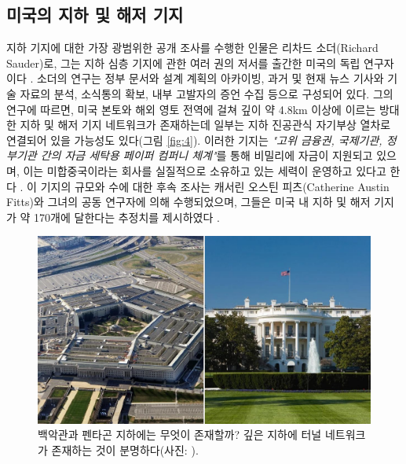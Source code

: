 \documentclass[10pt,twocolumn,letterpaper]{article}
\begin{document}
\subsection{미국의 지하 및 해저 기지}

지하 기지에 대한 가장 광범위한 공개 조사를 수행한 인물은 리차드 소더(Richard Sauder)로, 그는 지하 심층 기지에 관한 여러 권의 저서를 출간한 미국의 독립 연구자이다 \cite{22}. 소더의 연구는 정부 문서와 설계 계획의 아카이빙, 과거 및 현재 뉴스 기사와 기술 자료의 분석, 소식통의 확보, 내부 고발자의 증언 수집 등으로 구성되어 있다. 그의 연구에 따르면, 미국 본토와 해외 영토 전역에 걸쳐 깊이 약 4.8km 이상에 이르는 방대한 지하 및 해저 기지 네트워크가 존재하는데 일부는 지하 진공관식 자기부상 열차로 연결되어 있을 가능성도 있다(그림 \ref{fig:4}). 이러한 기지는 \textit{"고위 금융권, 국제기관, 정부기관 간의 자금 세탁용 페이퍼 컴퍼니 체계"}를 통해 비밀리에 자금이 지원되고 있으며, 이는 미합중국이라는 회사를 실질적으로 소유하고 있는 세력이 운영하고 있다고 한다 \cite{22}. 이 기지의 규모와 수에 대한 후속 조사는 캐서린 오스틴 피츠(Catherine Austin Fitts)와 그녀의 공동 연구자에 의해 수행되었으며, 그들은 미국 내 지하 및 해저 기지가 약 170개에 달한다는 추정치를 제시하였다 \cite{16,20}.

\begin{figure}[b]
\begin{center}
   \includegraphics[width=1\linewidth]{penta.jpg}
\end{center}
   \caption{백악관과 펜타곤 지하에는 무엇이 존재할까? 깊은 지하에 터널 네트워크가 존재하는 것이 분명하다(사진: \cite{31}).}
\label{fig:3}
\label{fig:onecol}
\end{figure}
\end{document}
